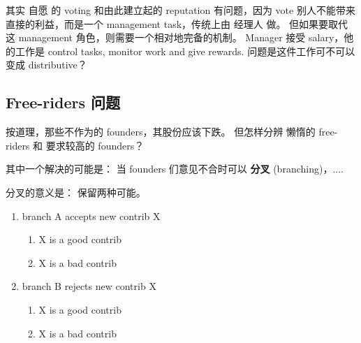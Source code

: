 \documentclass[12pt, orivec, fleqn]{article}
\newcommand{\cc}[2]{#1}
\newcommand{\cc}[2]{#2}
\begin{document}
\cc{
其实 自愿 的 voting 和由此建立起的 reputation 有问题，因为 vote 别人不能带来直接的利益，而是一个 management task，传统上由 经理人 做。  但如果要取代这 management 角色，则需要一个相对地完备的机制。   Manager 接受 salary，他的工作是 control tasks, monitor work and give rewards.   问题是这件工作可不可以变成 distributive？  }{
There may be a problem with basing reputation upon voluntary votes.  Voting for someone does not benefit the voter;  This is a management task traditionally done by managers.  If we want to replace such a role, we need an adequate mechanism.  The traditional manager gets paid, and his responsibility is to control tasks, monitor work, and give rewards.  The question is whether this job can be decentralized?
}


\secttoc
\subsection{\cc{Free-riders 问题}{The problem of free-riders}}

\cc{
按道理，那些不作为的 founders，其股份应该下跌。  但怎样分辨 懒惰的 free-riders 和 要求较高的 founders？
}{
In principle, if a founder hoards shares without performing useful work, his shares in the company should be reduced.	 But how could we distinguish between lazy free-riders and someone who has high standards for other people's work?
}

\cc{
其中一个解决的可能是： 当 founders 们意见不合时可以 \textbf{分叉} (branching)，....
}{
A possible solution is via \textbf{branching} when founders disagree with each other.
}

\cc{
分叉的意义是： 保留两种可能。 
}{
The essence of branching is:  to preserve both options in a disagreement.
}

\begin{enumerate}
	\item branch A accepts new contrib X
	\begin{enumerate}
		\item X is a good contrib
		\item X is a bad contrib
	\end{enumerate}
	\item branch B rejects new contrib X
	\begin{enumerate}
		\item X is a good contrib
		\item X is a bad contrib
	\end{enumerate}
\end{enumerate}
\end{document}
